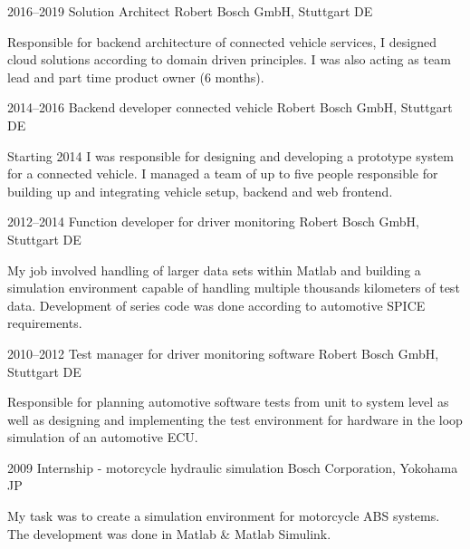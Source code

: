 \documentclass[]{friggeri-cv} %
\begin{document}
\begin{entrylist}
\entry
{2016--2019}
{Solution Architect}
{Robert Bosch GmbH, Stuttgart DE}
{Responsible for backend architecture of connected vehicle services, I designed cloud solutions according to domain driven principles. I was also acting as team lead and part time product owner (6 months).

}
\end{entrylist}
\begin{entrylist}
\entry
{2014--2016}
{Backend developer connected vehicle}
{Robert Bosch GmbH, Stuttgart DE}
{Starting 2014 I was responsible for designing and developing a prototype system for a connected vehicle. I managed a team of up to five people responsible for building up and integrating vehicle setup, backend and web frontend.

}
\end{entrylist}
\begin{entrylist}
\entry
{2012--2014}
{Function developer for driver monitoring}
{Robert Bosch GmbH, Stuttgart DE}
{My job involved handling of larger data sets within Matlab and building a simulation environment capable of handling multiple thousands kilometers of test data. Development of series code was done according to automotive SPICE requirements.

}
\end{entrylist}
\begin{entrylist}
\entry
{2010--2012}
{Test manager for driver monitoring software}
{Robert Bosch GmbH, Stuttgart DE}
{Responsible for planning automotive software tests from unit to system level as well as designing and implementing the test environment for hardware in the loop simulation of an automotive ECU.

}
\end{entrylist}
\begin{entrylist}
\entry
{2009}
{Internship - motorcycle hydraulic simulation}
{Bosch Corporation, Yokohama JP}
{My task was to create a simulation environment for motorcycle ABS systems. The development was done in Matlab \& Matlab Simulink.

}
\end{entrylist}
\end{document}
